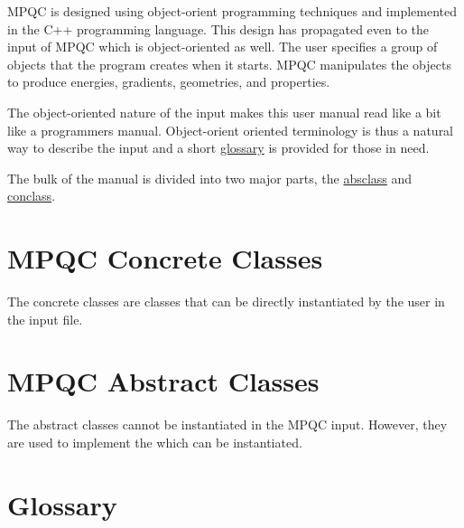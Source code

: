 \documentclass{report}
\begin{document}
MPQC is designed using object-orient programming techniques and
implemented in the C++ programming language.  This design has
propagated even to the input of MPQC which is object-oriented
as well.  The user specifies a group of objects that the program
creates when it starts.  MPQC manipulates the objects to produce
energies, gradients, geometries, and properties.

The object-oriented nature of the input makes this user manual
read like a bit like a programmers manual.  Object-orient oriented
terminology is thus a natural way to describe the input and a
short \hyperref{glossary}{glossary (Chapter~}{)}{glossary}
is provided for those in need.

The bulk of the manual is divided into two major parts, the
\hyperref{abstract classes}{abstract classes (Chapter~}{)}{absclass}
and
\hyperref{concrete classes}{concrete classes (Chapter~}{)}{conclass}.





\chapter{MPQC Concrete Classes}
\label{conclass}

The concrete classes are classes that can be directly instantiated
by the user in the input file.







\chapter{MPQC Abstract Classes}
\label{absclass}

The abstract classes cannot be instantiated in the MPQC input.
However, they are used to implement the
 which can be instantiated.




\chapter{Glossary}
\label{glossary}
\end{document}
